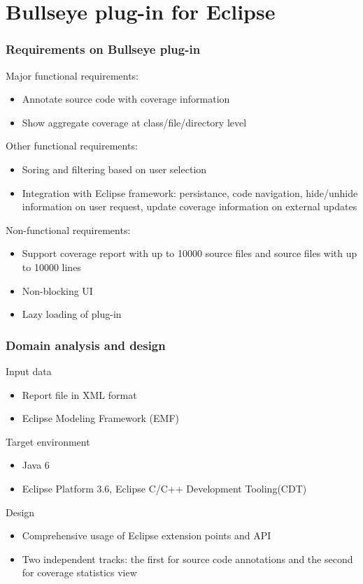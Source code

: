 \documentclass{beamer}
\begin{document}
\section{Bullseye plug-in for Eclipse}

\begin{frame}
  \frametitle{Requirements on Bullseye plug-in}
Major functional requirements:
\begin{itemize}
  \item Annotate source code with coverage information
  \item Show aggregate coverage at class/file/directory level
\end{itemize}
Other functional requirements:
\begin{itemize}
  \item Soring and filtering based on user selection
  \item Integration with Eclipse framework: persistance, code navigation, hide/unhide information on user request, update coverage information on external updates
\end{itemize}
Non-functional requirements:
\begin{itemize}
  \item Support coverage report with up to 10000 source files and source files with up to 10000 lines
  \item Non-blocking UI
  \item Lazy loading of plug-in
\end{itemize}
\end{frame}

\begin{frame}
  \frametitle{Domain analysis and design}
Input data
\begin{itemize}
  \item Report file in XML format 
  \item Eclipse Modeling Framework (EMF)
\end{itemize}
Target environment
\begin{itemize}
  \item Java 6
  \item Eclipse Platform 3.6, Eclipse C/C++ Development Tooling(CDT)
\end{itemize}
Design
\begin{itemize}
  \item Comprehensive usage of Eclipse extension points and API
  \item Two independent tracks: the first for source code annotations and the second for coverage statistics view
\end{itemize}
\end{frame}
\end{document}
